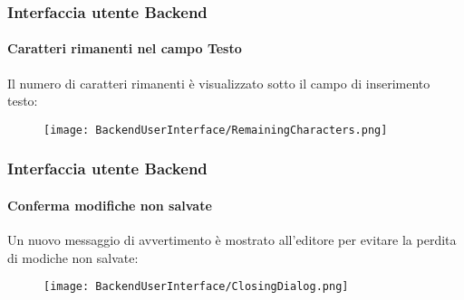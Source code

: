 \begin{frame}[fragile]
	\frametitle{Interfaccia utente Backend}
	\framesubtitle{Caratteri rimanenti nel campo Testo}

	Il numero di caratteri rimanenti è visualizzato sotto il campo di inserimento testo:

	\begin{figure}
		\texttt{[image: BackendUserInterface/RemainingCharacters.png]}
	\end{figure}

\end{frame}

\begin{frame}[fragile]
	\frametitle{Interfaccia utente Backend}
	\framesubtitle{Conferma modifiche non salvate}

	Un nuovo messaggio di avvertimento è mostrato all'editore per evitare la perdita di modiche non salvate:

	\begin{figure}
		\texttt{[image: BackendUserInterface/ClosingDialog.png]}
	\end{figure}

\end{frame}


